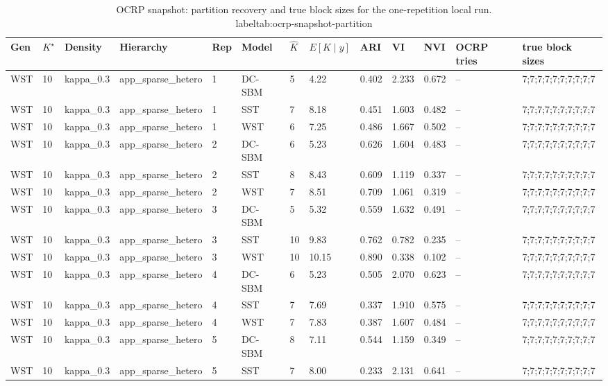 \begin{table}[!h]
\centering
\caption{OCRP snapshot: partition recovery and true block sizes for the one-repetition local run.\\label{tab:ocrp-snapshot-partition}}
\centering
\begin{tabular}[t]{lllllllllllll}
\toprule
Gen & $K^\star$ & Density & Hierarchy & Rep & Model & $\hat K$ & $E[K\mid y]$ & ARI & VI & NVI & OCRP tries & true block sizes\\
\midrule
WST & 10 & kappa_0.3 & app_sparse_hetero & 1 & DC-SBM & 5 & 4.22 & 0.402 & 2.233 & 0.672 & -- & 7;7;7;7;7;7;7;7;7;7\\
WST & 10 & kappa_0.3 & app_sparse_hetero & 1 & SST & 7 & 8.18 & 0.451 & 1.603 & 0.482 & -- & 7;7;7;7;7;7;7;7;7;7\\
WST & 10 & kappa_0.3 & app_sparse_hetero & 1 & WST & 6 & 7.25 & 0.486 & 1.667 & 0.502 & -- & 7;7;7;7;7;7;7;7;7;7\\
WST & 10 & kappa_0.3 & app_sparse_hetero & 2 & DC-SBM & 6 & 5.23 & 0.626 & 1.604 & 0.483 & -- & 7;7;7;7;7;7;7;7;7;7\\
WST & 10 & kappa_0.3 & app_sparse_hetero & 2 & SST & 8 & 8.43 & 0.609 & 1.119 & 0.337 & -- & 7;7;7;7;7;7;7;7;7;7\\
WST & 10 & kappa_0.3 & app_sparse_hetero & 2 & WST & 7 & 8.51 & 0.709 & 1.061 & 0.319 & -- & 7;7;7;7;7;7;7;7;7;7\\
WST & 10 & kappa_0.3 & app_sparse_hetero & 3 & DC-SBM & 5 & 5.32 & 0.559 & 1.632 & 0.491 & -- & 7;7;7;7;7;7;7;7;7;7\\
WST & 10 & kappa_0.3 & app_sparse_hetero & 3 & SST & 10 & 9.83 & 0.762 & 0.782 & 0.235 & -- & 7;7;7;7;7;7;7;7;7;7\\
WST & 10 & kappa_0.3 & app_sparse_hetero & 3 & WST & 10 & 10.15 & 0.890 & 0.338 & 0.102 & -- & 7;7;7;7;7;7;7;7;7;7\\
WST & 10 & kappa_0.3 & app_sparse_hetero & 4 & DC-SBM & 6 & 5.23 & 0.505 & 2.070 & 0.623 & -- & 7;7;7;7;7;7;7;7;7;7\\
WST & 10 & kappa_0.3 & app_sparse_hetero & 4 & SST & 7 & 7.69 & 0.337 & 1.910 & 0.575 & -- & 7;7;7;7;7;7;7;7;7;7\\
WST & 10 & kappa_0.3 & app_sparse_hetero & 4 & WST & 7 & 7.83 & 0.387 & 1.607 & 0.484 & -- & 7;7;7;7;7;7;7;7;7;7\\
WST & 10 & kappa_0.3 & app_sparse_hetero & 5 & DC-SBM & 8 & 7.11 & 0.544 & 1.159 & 0.349 & -- & 7;7;7;7;7;7;7;7;7;7\\
WST & 10 & kappa_0.3 & app_sparse_hetero & 5 & SST & 7 & 8.00 & 0.233 & 2.131 & 0.641 & -- & 7;7;7;7;7;7;7;7;7;7\\

\end{tabular}
\end{table}
